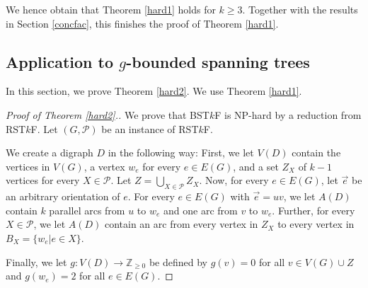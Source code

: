 \documentclass{article}
\newtheorem{Lemma}[Statement]{Lemma}
\begin{document}
 We hence obtain that Theorem \ref{hard1} holds for $k \geq 3$. Together with the results in Section \ref{concfac}, this finishes the proof of Theorem \ref{hard1}.

\subsection{Application to $g$-bounded spanning trees}\label{gziipj}

In this section, we prove Theorem \ref{hard2}. %
 We use Theorem \ref{hard1}.

\begin{proof}[Proof of Theorem \ref{hard2}.]
We prove that BST$k$F is NP-hard by a reduction from RST$k$F. Let $(G,\mathcal{P})$ be an instance of RST$k$F. %

We create a digraph $D$ in the following way: First, we let $V(D)$ contain the vertices in $V(G)$, a vertex $w_e$ for every $e \in E(G)$, and a set $Z_X$ of $k-1$ vertices for every $X \in \mathcal{P}$. Let $Z=\bigcup_{X \in \mathcal{P}}Z_X$. %
  Now, for every $e \in E(G)$, let $\vec{e}$ be an arbitrary orientation of $e$. For every $e \in E(G)$ with $\vec{e}=uv$, we let $A(D)$ contain $k$ parallel arcs from $u$ to $w_e$ and one arc from $v$ to $w_e$. Further, for every $X \in \mathcal{P}$, we let $A(D)$ contain an arc from every vertex in $Z_X$ to every vertex in $B_X=\{w_e|e \in X\}$.

Finally, we let $g:V(D)\rightarrow \mathbb{Z}_{\geq 0}$ be defined by $g(v)=0$ for all $v \in V(G)\cup Z$ and $g(w_e)=2$ for all $e \in E(G)$. 
\medskip



\end{proof}
\end{document}
